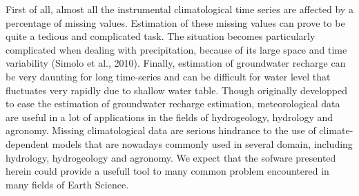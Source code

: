\documentclass[ARTICLETHERMIC.tex]{subfiles}
\begin{document}
First of all, almost all the instrumental climatological time series are affected by a percentage of missing values. Estimation of these missing values can prove to be quite a tedious and complicated task. The situation becomes particularly complicated when dealing with precipitation, because of its large space and time variability (Simolo et al., 2010). Finally, estimation of groundwater recharge can be very daunting for long time-series and can be difficult for water level that fluctuates very rapidly due to shallow water table. Though originally developped to ease the estimation of groundwater recharge estimation, meteorological data are useful in a lot of applications in the fields of hydrogeology, hydrology and agronomy. Missing climatological data are serious hindrance to the use of climate-dependent models that are nowadays commonly used in several domain, including hydrology, hydrogeology and agronomy. We expect that the sofware presented herein could provide a usefull tool to many common problem encountered in many fields of Earth Science.
\end{document}
